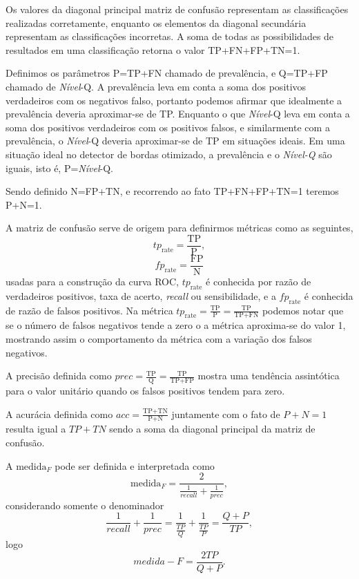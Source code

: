 Os valores da diagonal principal matriz de confusão representam as classificações realizadas corretamente, enquanto os elementos da diagonal secundária representam as classificações incorretas. A soma de todas as possibilidades de resultados em uma classificação retorna o valor TP+FN+FP+TN=1.

Definimos os parâmetros P=TP+FN chamado de prevalência, e Q=TP+FP chamado de \textit{Nível}-Q. A prevalência leva em conta a soma dos positivos verdadeiros com os negativos falso, portanto podemos afirmar que idealmente a prevalência deveria aproximar-se de TP. Enquanto o que \textit{Nível}-Q leva em conta a soma dos positivos verdadeiros com os positivos falsos, e similarmente com a prevalência, o \textit{Nível}-Q deveria aproximar-se de TP em situações ideais. Em uma situação ideal no detector de bordas otimizado, a prevalência e o \textit{Nível-Q} são iguais, isto é, P=\textit{Nível}-Q.

Sendo definido N=FP+TN, e recorrendo ao fato TP+FN+FP+TN=1 teremos P+N=1.  

A matriz de confusão serve de origem para definirmos métricas como as seguintes,
\begin{equation}\label{eq:tp_rate}
	tp_{\text{rate}}=\frac{\text{TP}}{\text{P}},
\end{equation}
\begin{equation}\label{eq:fp_rate}
	fp_{\text{rate}}=\frac{\text{FP}}{\text{N}}
\end{equation}
usadas para a construção da curva ROC, $tp_{\text{rate}}$ é conhecida por razão de verdadeiros positivos, taxa de acerto, \textit{recall} ou  sensibilidade, e a $fp_{\text{rate}}$ é conhecida de razão de falsos positivos. Na métrica $tp_{\text{rate}}=\frac{\text{TP}}{\text{P}}=\frac{\text{TP}}{\text{TP+FN}}$ podemos notar que se o número de falsos negativos tende a zero o a métrica aproxima-se do valor 1, mostrando assim o comportamento da métrica com a variação dos falsos negativos.

A precisão definida como $prec = \frac{\text{TP}}{\text{Q}}=\frac{\text{TP}}{\text{TP+FP}}$ mostra uma tendência assintótica para o valor unitário quando os falsos positivos tendem para zero.

A acurácia definida como $acc = \frac{\text{TP+TN}}{\text{P+N}}$ juntamente com o fato de $P+N=1$ resulta igual a $TP+TN$ sendo a soma da diagonal principal da matriz de confusão.

A $\text{medida}_F$ pode ser definida e interpretada como 
\begin{equation}\nonumber
\text{medida}_F=\frac{2}{\frac{1}{recall}+\frac{1}{prec}},
\end{equation}
considerando somente o denominador
\begin{equation}\nonumber
	\frac{1}{recall}+\frac{1}{prec}=\frac{1}{\frac{TP}{Q}}+\frac{1}{\frac{TP}{P}}= \frac{Q+P}{TP},
\end{equation}
logo
\begin{equation}\nonumber
	medida-F=\frac{2TP}{Q+P}.
\end{equation}

